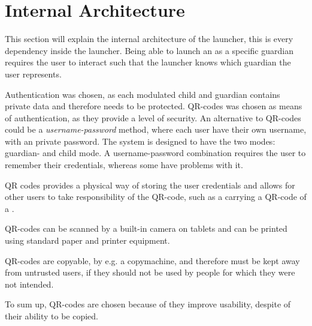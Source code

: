 \section{Internal Architecture}
This section will explain the internal architecture of the launcher, this is every dependency inside the launcher.
Being able to launch an \girafapp[] as a specific guardian requires the user to interact such that the launcher knows which guardian the user represents.

Authentication was chosen, as each modulated child and guardian contains private data and therefore needs to be protected. QR-codes was chosen as means of authentication, as they provide a level of security.
An alternative to QR-codes could be a \emph{username-password} method, where each user have their own username, with an private password. The system is designed to have the two modes: guardian- and child mode. A username-password combination requires the user to remember their credentials, whereas some \autists[] have problems with it. 

QR codes provides a physical way of storing the user credentials and allows for other users to take responsibility of the QR-code, such as a \guardian[] carrying a QR-code of a \autist[].

QR-codes can be scanned by a built-in camera on tablets and can be printed using standard paper and printer equipment. 

QR-codes are copyable, by e.g. a copymachine, and therefore must be kept away from untrusted users, if they should not be used by people for which they were not intended.

To sum up, QR-codes are chosen because of they improve usability, despite of their ability to be copied.


